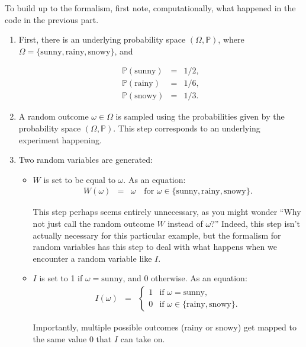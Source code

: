 \documentclass[6008notes.tex]{subfiles}
\begin{document}
To build up to the formalism, first note, computationally, what happened in the code in the previous part.

\begin{enumerate}
\item First, there is an underlying probability space $(\Omega , \mathbb {P})$, where $\Omega = \{ \text {sunny}, \text {rainy}, \text {snowy}\}$, and

\begin{eqnarray*}
\mathbb{P}(\text{sunny}) &=& 1/2, \\
\mathbb{P}(\text{rainy}) &=& 1/6, \\
\mathbb{P}(\text{snowy}) &=& 1/3.
\end{eqnarray*}

\item A random outcome $\omega \in \Omega$ is sampled using the probabilities given by the probability space $(\Omega , \mathbb {P})$. This step corresponds to an underlying experiment happening.

\item Two random variables are generated:

\begin{itemize}
\item $W$ is set to be equal to $\omega$. As an equation:
\begin{eqnarray*}
W(\omega) &=&\omega\quad\text{for }\omega\in\{\text{sunny},\text{rainy},\text{snowy}\}.
\end{eqnarray*}

This step perhaps seems entirely unnecessary, as you might wonder ``Why not just call the random outcome $W$ instead of $\omega$?'' Indeed, this step isn't actually necessary for this particular example, but the formalism for random variables has this step to deal with what happens when we encounter a random variable like $I$.

\item $I$ is set to 1 if $\omega =\text {sunny}$, and 0 otherwise. As an equation:
\begin{eqnarray*}
I(\omega)
&=&
\begin{cases}
  1 & \text{if }\omega=\text{sunny}, \\
  0 & \text{if }\omega\in\{\text{rainy},\text{snowy}\}.
\end{cases}
\end{eqnarray*}

Importantly, multiple possible outcomes (rainy or snowy) get mapped to the same value 0 that $I$ can take on.
\end{itemize}
\end{enumerate}
\end{document}
